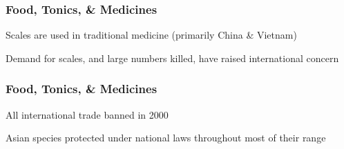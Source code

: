 \documentclass[10pt]{beamer}
\begin{document}
\begin{frame}[t]
\frametitle{Food, Tonics, \& Medicines}
\vspace{0.5cm}
	
	Scales are used in traditional medicine (primarily China \& Vietnam)\\
	
	\vspace{0.5cm}
	
	Demand for scales, and large numbers killed, have raised international concern
\end{frame}


\begin{frame}[t]
\frametitle{Food, Tonics, \& Medicines}
\vspace{0.5cm}
	
	All international trade banned in 2000\\
	
	\vspace{0.5cm}
	
	Asian species protected under national laws throughout most of their range\\
\end{frame}
\end{document}
